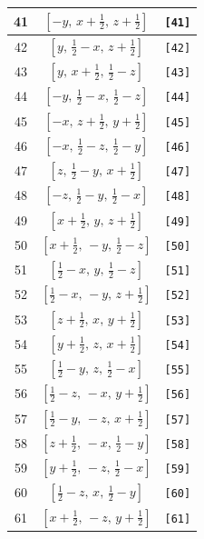 \documentclass[fleqn,8pt]{jsarticle}
\begin{document}
\begin{longtable}{ccc}
41 & $\left[ - y,\, x + \frac{1}{2},\, z + \frac{1}{2} \right]$ & {\tt [41]} \\ \hline
42 & $\left[ y,\, \frac{1}{2} - x,\, z + \frac{1}{2} \right]$ & {\tt [42]} \\ \hline
43 & $\left[ y,\, x + \frac{1}{2},\, \frac{1}{2} - z \right]$ & {\tt [43]} \\ \hline
44 & $\left[ - y,\, \frac{1}{2} - x,\, \frac{1}{2} - z \right]$ & {\tt [44]} \\ \hline
45 & $\left[ - x,\, z + \frac{1}{2},\, y + \frac{1}{2} \right]$ & {\tt [45]} \\ \hline
46 & $\left[ - x,\, \frac{1}{2} - z,\, \frac{1}{2} - y \right]$ & {\tt [46]} \\ \hline
47 & $\left[ z,\, \frac{1}{2} - y,\, x + \frac{1}{2} \right]$ & {\tt [47]} \\ \hline
48 & $\left[ - z,\, \frac{1}{2} - y,\, \frac{1}{2} - x \right]$ & {\tt [48]} \\ \hline
49 & $\left[ x + \frac{1}{2},\, y,\, z + \frac{1}{2} \right]$ & {\tt [49]} \\ \hline
50 & $\left[ x + \frac{1}{2},\, - y,\, \frac{1}{2} - z \right]$ & {\tt [50]} \\ \hline
51 & $\left[ \frac{1}{2} - x,\, y,\, \frac{1}{2} - z \right]$ & {\tt [51]} \\ \hline
52 & $\left[ \frac{1}{2} - x,\, - y,\, z + \frac{1}{2} \right]$ & {\tt [52]} \\ \hline
53 & $\left[ z + \frac{1}{2},\, x,\, y + \frac{1}{2} \right]$ & {\tt [53]} \\ \hline
54 & $\left[ y + \frac{1}{2},\, z,\, x + \frac{1}{2} \right]$ & {\tt [54]} \\ \hline
55 & $\left[ \frac{1}{2} - y,\, z,\, \frac{1}{2} - x \right]$ & {\tt [55]} \\ \hline
56 & $\left[ \frac{1}{2} - z,\, - x,\, y + \frac{1}{2} \right]$ & {\tt [56]} \\ \hline
57 & $\left[ \frac{1}{2} - y,\, - z,\, x + \frac{1}{2} \right]$ & {\tt [57]} \\ \hline
58 & $\left[ z + \frac{1}{2},\, - x,\, \frac{1}{2} - y \right]$ & {\tt [58]} \\ \hline
59 & $\left[ y + \frac{1}{2},\, - z,\, \frac{1}{2} - x \right]$ & {\tt [59]} \\ \hline
60 & $\left[ \frac{1}{2} - z,\, x,\, \frac{1}{2} - y \right]$ & {\tt [60]} \\ \hline
61 & $\left[ x + \frac{1}{2},\, - z,\, y + \frac{1}{2} \right]$ & {\tt [61]} \\ \hline

\end{longtable}
\end{document}
